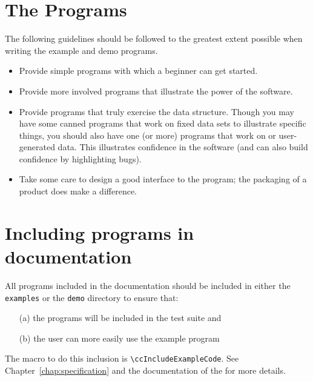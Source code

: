 \section{The Programs\label{sec:ex_and_demo_content}}

The following guidelines should be followed to the greatest extent possible
when writing the example and demo programs.
\begin{itemize}
   \item Provide simple programs with which a beginner can get started.
   \item Provide more involved programs that illustrate the power of the
         software.
   \item Provide programs that truly exercise the data structure.  Though you
         may have some canned programs that work on fixed data sets to 
         illustrate specific things, you should also have one (or more)
         programs that work on 
          or user-generated data. 
         This illustrates confidence in the software (and can also build
         confidence by highlighting bugs).
   \item Take some care to design a good interface to the program; 
         the packaging of a product does make a difference.
\end{itemize}

\section{Including programs in documentation\label{sec:programs_in_doc}}

All programs included in the documentation should be included in either
the \texttt{examples} or the \texttt{demo} directory to ensure that:
\begin{itemize}
   \item[(a)] the programs will be included in the test suite and
   \item[(b)] the user can more easily use the example program
\end{itemize}
The macro to do this inclusion is \verb|\ccIncludeExampleCode|.
See Chapter~\ref{chap:specification} and the documentation of the
 for more 
details.


